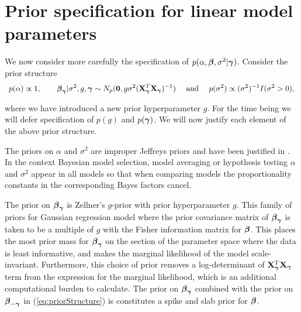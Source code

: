 \documentclass{article}[12pt]
\def\N{N}
\begin{document}
 
 
\section{Prior specification for linear model parameters}
\label{sec:model}

We now consider more carefully the specification of $p(\alpha,{\boldsymbol \beta},\sigma^2|{\boldsymbol \gamma})$.
Consider the prior structure
\begin{equation}
\label{eq:priorStructure}
\begin{array}{c}
\ds p(\alpha) \propto 1,  
\qquad 
\vbeta_\vgamma | \sigma^2, g, \vgamma \sim \N_p(\vzero, g \sigma^2 (\mX_\vgamma^T \mX_\vgamma)^{-1})
\quad \text{ and }  \quad 
\ds p(\sigma^2) \propto (\sigma^2)^{-1} I(\sigma^2 > 0),                      
\end{array}
\end{equation} 

\noindent where we have introduced a new prior hyperparameter $g$.
For the time being we will defer specification of $p(g)$ and $p({\boldsymbol \gamma})$.
We will now justify each element of the above prior structure.

The priors on $\alpha$ and $\sigma^2$ are improper Jeffreys priors and have been justified 
in \cite{Berger2012}. In the context Bayesian model selection, model averaging or hypothesis 
testing $\alpha$ and $\sigma^2$ appear in all models 
so that when comparing models the proportionality constants in the corresponding
Bayes factors cancel.

The prior on ${\boldsymbol \beta}_{\boldsymbol \gamma}$ is Zellner's $g$-prior \citep[see for example,][]{Zellner1986} with prior 
hyperparameter $g$. This family of priors for Gaussian regression model where the prior covariance 
matrix of ${\boldsymbol \beta}_{\boldsymbol \gamma}$ is taken to be a multiple of $g$ with the Fisher information matrix for ${\boldsymbol \beta}$. 
This places the most prior mass for ${\boldsymbol \beta}_{\boldsymbol \gamma}$ on the section of the parameter space where the data is 
least informative, and makes the marginal likelihood of the model scale-invariant. Furthermore, this 
choice of prior removes a log-determinant of ${\bf X}_{\boldsymbol \gamma}^T{\bf X}_{\boldsymbol \gamma}$ term from the expression for the marginal 
likelihood, which is an additional computational burden to calculate.
The prior on ${\boldsymbol \beta}_{\boldsymbol \gamma}$ combined with the prior on ${\boldsymbol \beta}_{-{\boldsymbol \gamma}}$
in (\ref{eq:priorStructure}) is constitutes  a spike and slab prior for ${\boldsymbol \beta}$.
 
\end{document}
